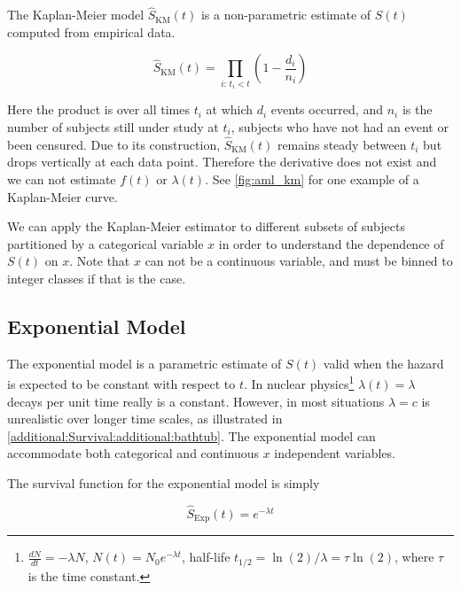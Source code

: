 The Kaplan-Meier model \cite{km} $\hat{S}_{\text{KM}}\left(t\right)$ is a non-parametric
estimate of $S\left(t\right)$ computed from empirical data.

\begin{equation}\label{eq:Survival:KM}
\hat{S}_{\text{KM}}\left(t\right) = \prod_{i:\,t_{i} < t} \left(1 - \frac{d_{i}}{n_{i}}\right)
\end{equation}

\noindent Here the product is over all times $t_{i}$ at which $d_{i}$ events occurred,
and $n_{i}$ is the number of subjects still under study at $t_{i}$,
\ie subjects who have not had an event or been censured.
Due to its construction, $\hat{S}_{\text{KM}}\left(t\right)$ remains steady
between $t_{i}$ but drops vertically at each data point.
Therefore the derivative does not exist and we can not estimate $f\left(t\right)$ or $\lambda\left(t\right)$.
See \cref{fig:aml_km} for one example of a Kaplan-Meier curve.

We can apply the Kaplan-Meier estimator to different subsets of subjects partitioned by a categorical variable $x$
in order to understand the dependence of $S\left(t\right)$ on $x$.
Note that $x$ can not be a continuous variable, and must be binned to integer classes if that is the case.

\subsection{Exponential Model}
\label{additional:Survival:exp}
The exponential model is a parametric estimate of $S\left(t\right)$
valid when the hazard is expected to be constant with respect to $t$.
In nuclear physics\footnote{$\frac{dN}{dt} = -\lambda N$, $N\left(t\right) = N_{0} e^{-\lambda t}$, half-life $t_{1/2} = \ln\left(2\right) / \lambda = \tau \ln\left(2\right)$, where $\tau$ is the time constant.} $\lambda\left(t\right) = \lambda$
decays per unit time really is a constant.
However, in most situations $\lambda = c$ is unrealistic over longer time scales,
as illustrated in \cref{additional:Survival:additional:bathtub}.
The exponential model can accommodate both categorical and continuous $x$ independent variables.

The survival function for the exponential model is simply

\begin{equation}\label{eq:Survival:exp}
\hat{S}_{\text{Exp}}\left(t\right) = e^{-\lambda t}
\end{equation}

